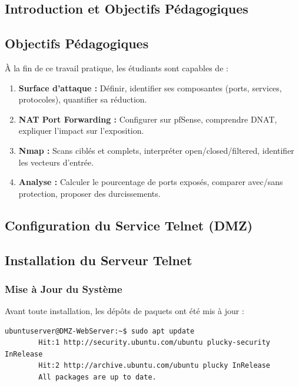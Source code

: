 \documentclass[12pt,a4paper,openany]{report}
\begin{document}
	\subsection{Introduction et Objectifs Pédagogiques}
	
	\subsection{Objectifs Pédagogiques}
	À la fin de ce travail pratique, les étudiants sont capables de :
	
	\begin{enumerate}[leftmargin=*]
		\item \textbf{Surface d'attaque :} Définir, identifier ses composantes (ports, services, protocoles), quantifier sa réduction.
		\item \textbf{NAT Port Forwarding :} Configurer sur pfSense, comprendre DNAT, expliquer l'impact sur l'exposition.
		\item \textbf{Nmap :} Scans ciblés et complets, interpréter open/closed/filtered, identifier les vecteurs d'entrée.
		\item \textbf{Analyse :} Calculer le pourcentage de ports exposés, comparer avec/sans protection, proposer des durcissements.
	\end{enumerate}
	
	\subsection{Configuration du Service Telnet (DMZ)}
	
	\subsection{Installation du Serveur Telnet}
	
	\subsubsection{Mise à Jour du Système}
	Avant toute installation, les dépôts de paquets ont été mis à jour :
	
	\begin{lstlisting}[caption=Mise à jour des paquets système]
		ubuntuserver@DMZ-WebServer:~$ sudo apt update
		Hit:1 http://security.ubuntu.com/ubuntu plucky-security InRelease
		Hit:2 http://archive.ubuntu.com/ubuntu plucky InRelease
		All packages are up to date.
	\end{lstlisting}
	
\end{document}

